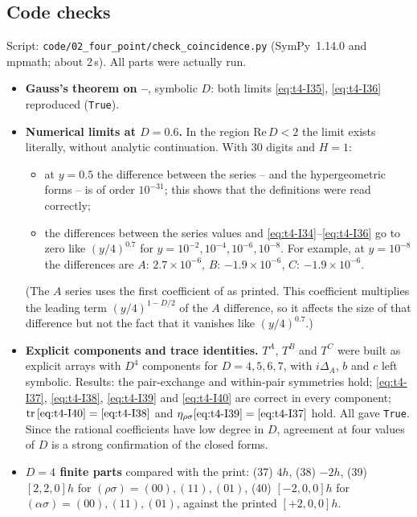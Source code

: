 \subsection{Code checks \texorpdfstring{\tC}{}}\label{sec:t4-code}
Script: \texttt{code/02\_four\_point/check\_coincidence.py} (SymPy~1.14.0 and mpmath; about
2\,s). All parts were actually run.
\begin{itemize}
\item[(1)] \textbf{Gauss's theorem on --}, symbolic \(D\): both limits
\eqref{eq:t4-I35}, \eqref{eq:t4-I36} reproduced (\texttt{True}).
\item[(2)] \textbf{Numerical limits at \(D=0.6\).} In the region \(\mathrm{Re}\,D<2\) the limit exists
literally, without analytic continuation. With 30 digits and \(H=1\):
\begin{itemize}[nosep]
\item at \(y=0.5\) the difference between the series -- and the hypergeometric
forms -- is of order \(10^{-31}\); this shows that the definitions were read
correctly;
\item the differences between the series values and \eqref{eq:t4-I34}--\eqref{eq:t4-I36} go to zero
like \((y/4)^{0.7}\) for \(y=10^{-2},10^{-4},10^{-6},10^{-8}\). For example, at \(y=10^{-8}\) the
differences are \(A\): \(2.7\times10^{-6}\), \(B\): \(-1.9\times10^{-6}\), \(C\): \(-1.9\times10^{-6}\).
\end{itemize}
(The \(A\) series uses the first coefficient of  as printed. This coefficient
multiplies the leading term \((y/4)^{1-D/2}\) of the \(A\) difference, so it affects the size
of that difference but not the fact that it vanishes like \((y/4)^{0.7}\).)
\item[(3)] \textbf{Explicit components and trace identities.} \(T^A\), \(T^B\) and \(T^C\) were built
as explicit arrays with \(D^4\) components for \(D=4,5,6,7\), with \(i\Delta_A\), \(b\) and \(c\)
left symbolic. Results: the pair-exchange and within-pair symmetries hold;
\eqref{eq:t4-I37}, \eqref{eq:t4-I38}, \eqref{eq:t4-I39} and \eqref{eq:t4-I40} are correct in every
component; \(\mathrm{tr}\,\eqref{eq:t4-I40}=\eqref{eq:t4-I38}\) and
\(\eta_{\rho\sigma}\eqref{eq:t4-I39}=\eqref{eq:t4-I37}\) hold. All gave \texttt{True}. Since the
rational coefficients have low degree in \(D\), agreement at four values of \(D\) is a strong
confirmation of the closed forms.
\item[(4)] \textbf{\(D=4\) finite parts} compared with the print: (37) \(4h\), (38) \(-2h\),
(39) \([2,2,0]h\) for \((\rho\sigma)=(00),(11),(01)\), (40) \([-2,0,0]h\) for
\((\alpha\sigma)=(00),(11),(01)\), against the printed \([+2,0,0]h\).
\end{itemize}
